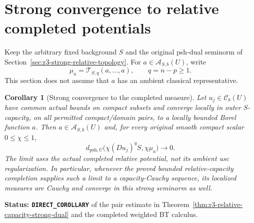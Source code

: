 \documentclass[11pt,a4paper]{article}
\numberwithin{equation}{section}
\newtheorem{corollary}[theorem]{Corollary}
\theoremstyle{definition}
\theoremstyle{remark}
\begin{document}


\section{Strong convergence to relative completed potentials}
\label{sec:r3-completed-strong-topology}

Keep the arbitrary fixed background $S$ and the original psh-dual
seminorm of Section~\ref{sec:r3-strong-relative-topology}. For
$a\in\mathcal A_{S,b}(U)$, write
\[
 \mathcal\mu_a=\mathcal T_{S,q}(a,\ldots,a),\qquad q=n-p\geq1.
\]
This section does not assume that $a$ has an ambient classical
representative.

\begin{corollary}[Strong convergence to the completed measure]
\label{cor:r3-completed-strong-dual}
Let $u_j\in\mathcal C_b(U)$ have common actual bounds on compact
subsets and converge locally in outer $S$-capacity, on all
permitted compact/domain pairs, to a locally bounded Borel function
$a$. Then $a\in\mathcal A_{S,b}(U)$ and, for every original
smooth compact scalar $0\leq\chi\leq1$,
\begin{equation}
 d_{\mathrm{psh},U}
       \bigl(\chi(Du_j)^qS,\chi\mathcal\mu_a\bigr)
                     \longrightarrow0.
 \label{eq:r3-completed-strong-dual}
\end{equation}
The limit uses the actual completed relative potential, not its
ambient usc regularization. In particular, whenever the proved
bounded relative-capacity completion supplies such a limit to a
capacity-Cauchy sequence, its localized measures are Cauchy and
converge in this strong seminorm as well.
\end{corollary}

\noindent\textbf{Status: \texttt{DIRECT\_COROLLARY}} of the
pair estimate in
Theorem~\ref{thm:r3-relative-capacity-strong-dual} and the
completed weighted BT calculus.
\end{document}
